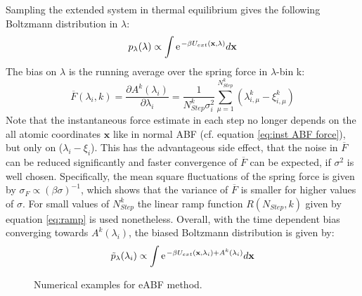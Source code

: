 Sampling the extended system in thermal equilibrium gives the following Boltzmann distribution in $\lambda$:
\begin{equation}
  p_\lambda(\lambda) \propto \int \e^{-\beta U_{ext}(\textbf{x},\lambda)} d\textbf{x} \\
\end{equation}
The bias on $\lambda$ is the running average over the spring force in $\lambda$-bin k:
\begin{equation}
  \overline{F}(\lambda_{i}, k) = \frac{\partial A^{k}(\lambda_{i})}{\partial \lambda_i} = \frac{1}{N_{Step}^{k}\sigma_i^2} \sum_{\mu=1}^{N_{Step}^{k}} (\lambda_{i,\mu}^{k}-\xi_{i,\mu}^{k})
  \label{eq:eABF bias}
\end{equation}
Note that the instantaneous force estimate in each step no longer depends on the all atomic coordinates $\textbf{x}$ like in normal ABF (cf. equation \ref{eq:inst ABF force}), but only on ($\lambda_i - \xi_i$).
This has the advantageous side effect, that the noise in $\overline{F}$ can be reduced significantly and faster convergence of $\overline{F}$ can be expected, if $\sigma^2$ is well chosen.\autocite{lesage2017smoothed} Specifically, the mean square fluctuations of the spring force is given by $\sigma_F \propto (\beta\sigma)^{-1}$, which shows that the variance of $\overline{F}$ is smaller for higher values of $\sigma$.
For small values of $N_{Step}^{k}$ the linear ramp function $R(N_{Step},k)$ given by equation \ref{eq:ramp} is used nonetheless. Overall, with the time dependent bias converging towards $A^{k}(\lambda_{i})$, the biased Boltzmann distribution is given by:
\begin{equation}
  \tilde{p}_\lambda(\lambda_i) \propto \int \e^{-\beta U_{ext}(\textbf{x},\lambda_i) + A^{k}(\lambda_i)} d\textbf{x}
\end{equation}

\begin{figure}[H]
    \centering
    \caption{Numerical examples for eABF method.}
\label{fig:eABF traj}%
\end{figure}

